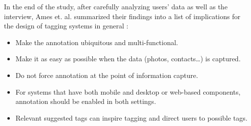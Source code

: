 In the end of the study, after carefully analyzing users' data as well as the interview, Ames et. al. summarized their findings into a list of implications for the design of tagging systems in general \cite{ames2007we}:

\begin{itemize}
    \item Make the annotation ubiquitous and multi-functional.
    \item Make it as easy as possible when the data (photos, contacts\dots) is captured.
    \item Do not force annotation at the point of information capture.
    \item For systems that have both mobile and desktop or web-based components, annotation should be enabled in both settings.
    \item Relevant suggested tags can inspire tagging and direct users to possible tags.
\end{itemize}

